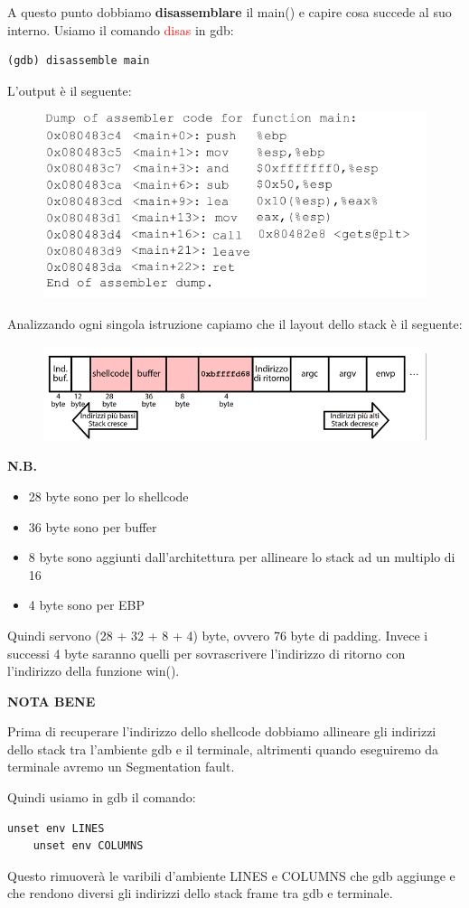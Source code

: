 A questo punto dobbiamo \textbf{disassemblare} il main() e capire cosa succede al suo interno. Usiamo il comando \textcolor{red}{disas} in gdb:
\begin{lstlisting}[style=bashstyle]
    (gdb) disassemble main
\end{lstlisting}
L'output è il seguente:
\begin{figure}[h]
    \includegraphics[width=\textwidth]{Capitolo 3/Figure/disas-main-stack5.png}
\end{figure}

Analizzando ogni singola istruzione capiamo che il layout dello stack è il seguente:
\begin{figure}[h]
    \includegraphics[width=\textwidth]{Capitolo 3/Figure/layout-stack5.png}
\end{figure}
\clearpage
\textbf{N.B.}\begin{itemize}
    \item 28 byte sono per lo shellcode
    \item 36 byte sono per buffer
    \item 8 byte sono aggiunti dall'architettura per allineare lo stack ad un multiplo di 16
    \item 4 byte sono per EBP
\end{itemize}
Quindi servono (28 + 32 + 8 + 4) byte, ovvero 76 byte di padding. Invece i successi 4 byte saranno quelli per sovrascrivere l'indirizzo di ritorno con l'indirizzo della funzione win().

\textbf{NOTA BENE}
\begin{mdframed}[backgroundcolor=gray!10,linewidth=1pt]
Prima di recuperare l'indirizzo dello shellcode dobbiamo allineare gli indirizzi dello stack tra l'ambiente gdb e il terminale, altrimenti quando eseguiremo da terminale avremo un Segmentation fault.

Quindi usiamo in gdb il comando:
\begin{lstlisting}[style=bashstyle]
    unset env LINES
    unset env COLUMNS
\end{lstlisting}
Questo rimuoverà le varibili d'ambiente LINES e COLUMNS che gdb aggiunge e che rendono diversi gli indirizzi dello stack frame tra gdb e terminale.
\end{mdframed}

